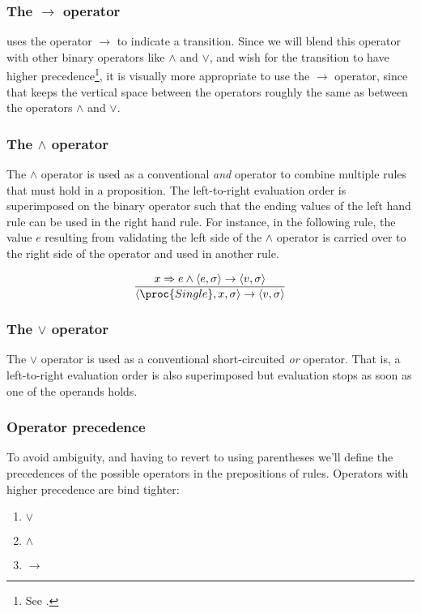 \subsubsection{The $\rightarrow$ operator}

\cite{sos} uses the operator $\longrightarrow$ to indicate a transition. Since
we will blend this operator with other binary operators like $\wedge$ and
$\vee$, and wish for the transition to have higher precedence\footnote{See
.}, it is visually more appropriate to use the
$\rightarrow$ operator, since that keeps the vertical space between the
operators roughly the same as between the operators $\wedge$ and $\vee$.

\subsubsection{The $\wedge$ operator}

The $\wedge$ operator is used as a conventional \emph{and} operator to combine
multiple rules that must hold in a proposition. The left-to-right evaluation
order is superimposed on the binary operator such that the ending values of the
left hand rule can be used in the right hand rule. For instance, in the
following rule, the value $e$ resulting from validating the left side of the
$\wedge$ operator is carried over to the right side of the operator and used in
another rule.

\begin{equation}\label{appendix:equation:single}
{\displaystyle
  x\Rightarrow e
\wedge
  \left\langle e,\sigma\right\rangle
  \rightarrow
  \left\langle v,\sigma\right\rangle
\over\displaystyle
  \left\langle \proc{Single}, x,\sigma\right\rangle
  \rightarrow
  \left\langle v,\sigma\right\rangle
}
\end{equation}

\subsubsection{The $\vee$ operator}

The $\vee$ operator is used as a conventional short-circuited \emph{or}
operator. That is, a left-to-right evaluation order is also superimposed but
evaluation stops as soon as one of the operands holds.

\subsubsection{Operator precedence}\label{appendix:sos:precedence}

To avoid ambiguity, and having to revert to using parentheses we'll define the
precedences of the possible operators in the prepositions of rules. Operators
with higher precedence are bind tighter:

\begin{enumerate}

\item $\vee$

\item $\wedge$

\item $\rightarrow$

\end{enumerate}
